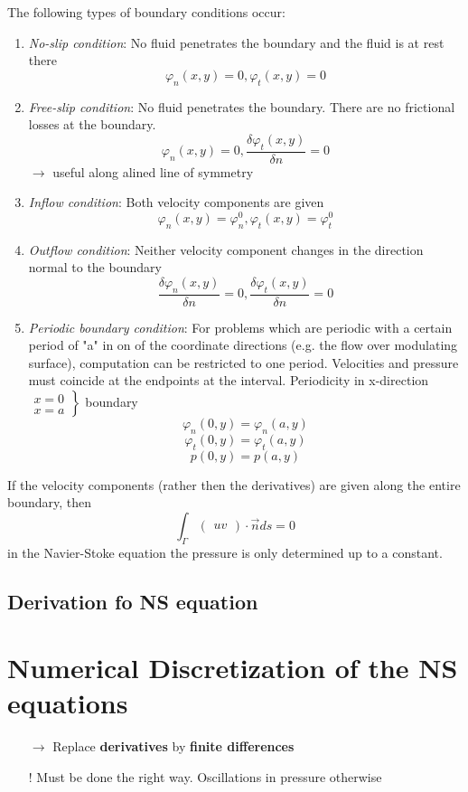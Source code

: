 \documentclass[a4paper,11pt]{scrartcl}
\begin{document}
The following types of boundary conditions occur:
\begin{enumerate}
	\item \textit{No-slip condition}: No fluid penetrates the boundary and the fluid is at rest there
	\[ \varphi_n(x,y) = 0, \varphi_t(x,y)=0\]
	\item \textit{Free-slip condition}: No fluid penetrates the boundary. There are no frictional losses at the boundary.
	\[ \varphi_n (x,y)= 0, \frac{\delta \varphi_t(x,y)}{\delta n} = 0 \]
	$\rightarrow$ useful along alined line of symmetry
	\item \textit{Inflow condition}: Both velocity components are given
	\[ \varphi_n(x,y) = \varphi_n^0, \varphi_t(x,y) = \varphi_t^0\]
	\item \textit{Outflow condition}: Neither velocity component changes in the direction normal to the boundary
	\[ \frac{\delta \varphi_n(x,y)}{\delta n} = 0, \frac{\delta \varphi_t(x,y)}{\delta n} = 0\]
	\item \textit{Periodic boundary condition}: For problems which are periodic with a certain period of "a" in on of the coordinate directions (e.g. the flow over modulating surface), computation can be restricted to one period. Velocities and pressure must coincide at the endpoints at the interval. Periodicity in x-direction $\left.\begin{matrix}
	x = 0\\
	x=a
	\end{matrix}\right\rbrace$ boundary
	\[\varphi_n (0, y) = \varphi_n(a,y)\]
	\[ \varphi_t(0,y) = \varphi_t(a,y)\]
	\[ p (0, y) = p(a,y)\]
	
\end{enumerate}

If the velocity components (rather then the derivatives) are given along the entire boundary, then
\[ \int_\Gamma \begin{pmatrix}
u
v
\end{pmatrix} \cdot \vec{n} ds = 0\]
in the Navier-Stoke equation the pressure is only determined up to a constant.

\subsection{Derivation fo NS equation} %


\section{Numerical Discretization of the NS equations}
\begin{itemize}
	\item[$\rightarrow$] Replace \textbf{derivatives} by \textbf{finite differences}
	\item[!] Must be done the right way. Oscillations in pressure otherwise
\end{itemize}
\end{document}

